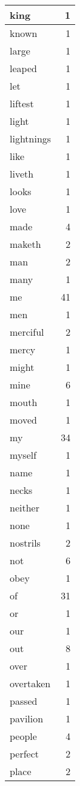 \begin{center}
\begin{longtable}{l|r}
king & 1 \\ \hline
known & 1 \\ \hline
large & 1 \\ \hline
leaped & 1 \\ \hline
let & 1 \\ \hline
liftest & 1 \\ \hline
light & 1 \\ \hline
lightnings & 1 \\ \hline
like & 1 \\ \hline
liveth & 1 \\ \hline
looks & 1 \\ \hline
love & 1 \\ \hline
made & 4 \\ \hline
maketh & 2 \\ \hline
man & 2 \\ \hline
many & 1 \\ \hline
me & 41 \\ \hline
men & 1 \\ \hline
merciful & 2 \\ \hline
mercy & 1 \\ \hline
might & 1 \\ \hline
mine & 6 \\ \hline
mouth & 1 \\ \hline
moved & 1 \\ \hline
my & 34 \\ \hline
myself & 1 \\ \hline
name & 1 \\ \hline
necks & 1 \\ \hline
neither & 1 \\ \hline
none & 1 \\ \hline
nostrils & 2 \\ \hline
not & 6 \\ \hline
obey & 1 \\ \hline
of & 31 \\ \hline
or & 1 \\ \hline
our & 1 \\ \hline
out & 8 \\ \hline
over & 1 \\ \hline
overtaken & 1 \\ \hline
passed & 1 \\ \hline
pavilion & 1 \\ \hline
people & 4 \\ \hline
perfect & 2 \\ \hline
place & 2 \\ \hline

\end{longtable}
\end{center}
